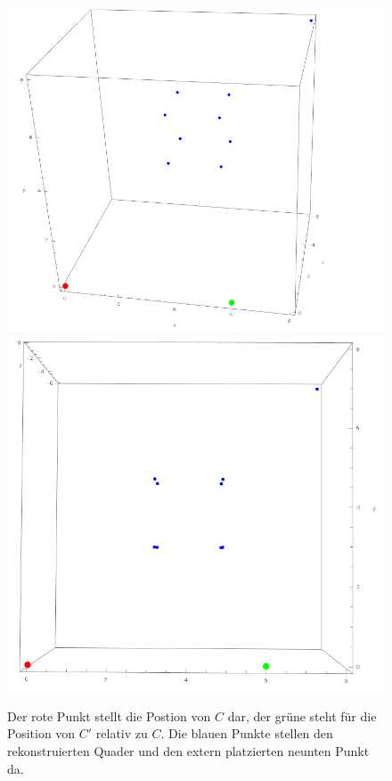 \begin{figure}[!htb]
	\includegraphics[width=\linewidth]{images/MinimalBeispiel_reconstructed.png}
	\endminipage\hfill
	\includegraphics[width=\linewidth]{images/MinimalBeispiel_reconstructed_3.png}
	\endminipage\hfill
	\caption[Programmplot der rekonstruierten Szene]{Der rote Punkt stellt die Postion von $C$ dar, der grüne steht für die Position von $C'$ relativ zu $C$. Die blauen Punkte stellen den rekonstruierten Quader und den extern platzierten neunten Punkt da.}
		\label{fig:Quader1}
\end{figure}


